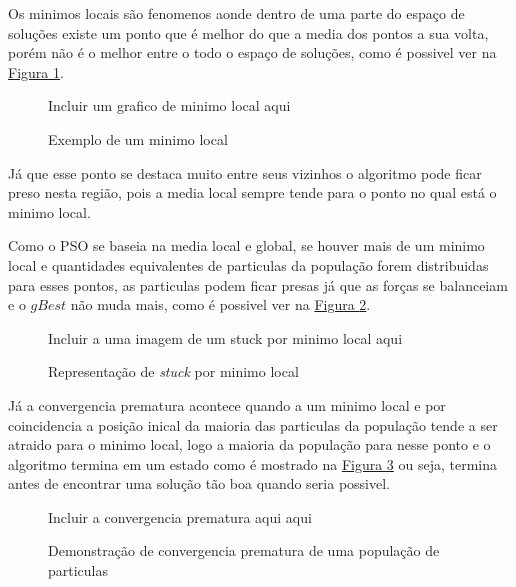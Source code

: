             Os minimos locais são fenomenos aonde dentro de uma parte do espaço de soluções existe um ponto que é melhor do que a media dos pontos a sua volta, porém não é o melhor entre o todo o espaço de soluções, como é possivel ver na \hyperref[fig:ex-minimolocal]{Figura \ref{fig:ex-minimolocal}}.\newline
            \begin{figure}[h]
                \centering
                \small{Incluir um grafico de minimo local aqui}
                \caption{Exemplo de um minimo local}
                \label{fig:ex-minimolocal}
            \end{figure}
            

            Já que esse ponto se destaca muito entre seus vizinhos o algoritmo pode ficar preso nesta região, pois a media local sempre tende para o ponto no qual está o minimo local.\newline

            Como o PSO se baseia na media local e global, se houver mais de um minimo local e quantidades equivalentes de particulas da população forem distribuidas para esses pontos, as particulas podem ficar presas já que as forças se balanceiam e o $gBest$ não muda mais, como é possivel ver na \hyperref[fig:stuck-por-minimolocal]{Figura \ref{fig:stuck-por-minimolocal}}.\newline
            
            \begin{figure}[h]
                \centering
                \small{Incluir a uma imagem de um stuck por minimo local aqui}
                \caption{Representação de \textit{stuck} por minimo local}
                \label{fig:stuck-por-minimolocal}
            \end{figure}
            
            
            Já a convergencia prematura acontece quando a um minimo local e por coincidencia a posição inical da maioria das particulas da população tende a ser atraido para o minimo local, logo a maioria da população para nesse ponto e o algoritmo termina em um estado como é mostrado na 
            \hyperref[fig:convergencia-prematura]{Figura \ref{fig:convergencia-prematura}} 
            ou seja, termina antes de encontrar uma solução tão boa quando seria possivel.\newline

            \begin{figure}[h]
                \centering
                \small{Incluir a convergencia prematura aqui aqui}
                \caption{Demonstração de convergencia prematura de uma população de particulas}
                \label{fig:convergencia-prematura}
            \end{figure}
            

